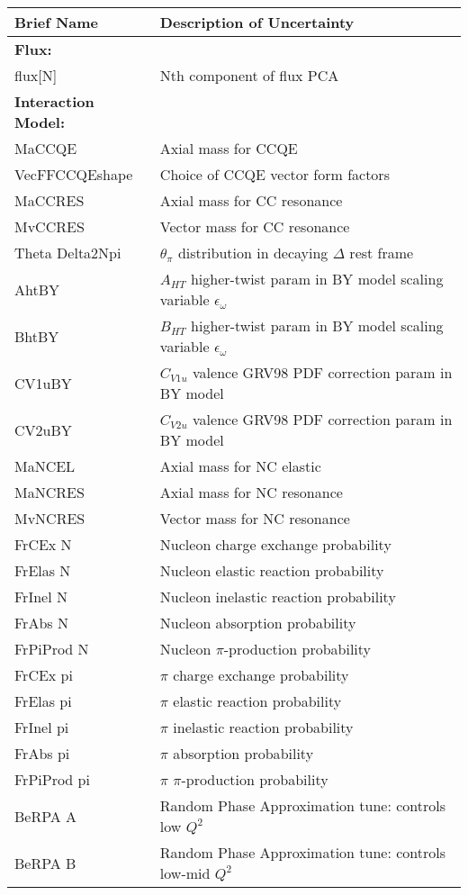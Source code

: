 \begin{longtable}{ll}\hline \hline
Brief Name & Description of Uncertainty \\  \hline \hline
\textbf{Flux:} & \\
flux[N] & Nth component of flux PCA \\ \hline
\textbf{Interaction Model:} & \\
MaCCQE & Axial mass for CCQE \\
VecFFCCQEshape & Choice of CCQE vector form factors \\
MaCCRES & Axial mass for CC resonance \\
MvCCRES & Vector mass for CC resonance \\
Theta Delta2Npi & $\theta_{\pi}$ distribution in decaying $\Delta$ rest frame \\
AhtBY & $A_{HT}$ higher-twist param in BY model scaling variable $\epsilon_{\omega}$ \\
BhtBY & $B_{HT}$ higher-twist param in BY model scaling variable $\epsilon_{\omega}$ \\
CV1uBY & $C_{V1u}$ valence GRV98 PDF correction param in BY model \\
CV2uBY & $C_{V2u}$ valence GRV98 PDF correction param in BY model \\
MaNCEL & Axial mass for NC elastic \\
MaNCRES & Axial mass for NC resonance \\
MvNCRES & Vector mass for NC resonance \\
FrCEx N & Nucleon charge exchange probability \\
FrElas N & Nucleon elastic reaction probability \\
FrInel N & Nucleon inelastic reaction probability \\
FrAbs N & Nucleon absorption probability \\
FrPiProd N & Nucleon $\pi$-production probability \\
FrCEx pi & $\pi$ charge exchange probability \\
FrElas pi & $\pi$ elastic reaction probability \\
FrInel pi & $\pi$ inelastic reaction probability \\
FrAbs pi & $\pi$ absorption probability \\
FrPiProd pi & $\pi$ $\pi$-production probability \\
BeRPA A & Random Phase Approximation tune: controls low $Q^{2}$ \\
BeRPA B &  Random Phase Approximation tune: controls low-mid $Q^{2}$\\

\end{longtable}
